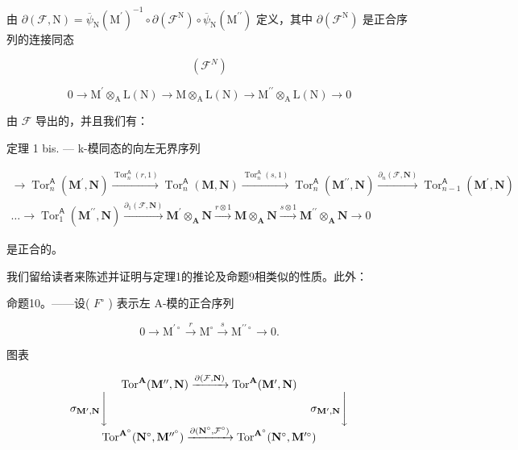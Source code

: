由 \(\partial(\mathcal{F},\mathrm{N})=\overline{\psi}_{\mathrm{N}}(\mathrm{M}^{\prime})^{-1}\circ\partial(\mathcal{F}^{\mathrm{N}})\circ\overline{\psi}_{\mathrm{N}}(\mathrm{M}^{\prime\prime})\) 定义，其中 \(\partial(\mathcal{F}^{\mathrm{N}})\) 是正合序列的连接同态

\[
(\mathcal {F} ^ {N})
\]

\[
0 \rightarrow \mathrm{M} ^ {\prime} \otimes_ {\mathrm{A}} \mathrm{L} (\mathrm{N}) \rightarrow \mathrm{M} \otimes_ {\mathrm{A}} \mathrm{L} (\mathrm{N}) \rightarrow \mathrm{M} ^ {\prime \prime} \otimes_ {\mathrm{A}} \mathrm{L} (\mathrm{N}) \rightarrow 0
\]

由 \(\mathcal{F}\) 导出的，并且我们有：

定理 1 bis. --- k-模同态的向左无界序列

\[
\begin{array}{l}\rightarrow \operatorname{Tor} _ {n} ^ {\mathsf {A}} (\mathbf {M} ^ {\prime}, \mathbf {N}) \xrightarrow {\operatorname{Tor} _ {n} ^ {\mathsf {A}} (r , 1)} \operatorname{Tor} _ {n} ^ {\mathsf {A}} (\mathbf {M}, \mathbf {N}) \xrightarrow {\operatorname{Tor} _ {n} ^ {\mathsf {A}} (s , 1)} \operatorname{Tor} _ {n} ^ {\mathsf {A}} (\mathbf {M} ^ {\prime \prime}, \mathbf {N}) \xrightarrow {\partial_ {n} (\mathcal {F} , \mathbf {N})} \operatorname{Tor} _ {n - 1} ^ {\mathsf {A}} (\mathbf {M} ^ {\prime}, \mathbf {N})\\\dots \rightarrow \operatorname{Tor} _ {1} ^ {\mathsf {A}} (\mathbf {M} ^ {\prime \prime}, \mathbf {N}) \xrightarrow {\partial_ {1} (\mathcal {F} , \mathbf {N})} \mathbf {M} ^ {\prime} \otimes_ {\mathbf {A}} \mathbf {N} \xrightarrow {r \otimes 1} \mathbf {M} \otimes_ {\mathbf {A}} \mathbf {N} \xrightarrow {s \otimes 1} \mathbf {M} ^ {\prime \prime} \otimes_ {\mathbf {A}} \mathbf {N} \longrightarrow 0\end{array}
\]

是正合的。

我们留给读者来陈述并证明与定理1的推论及命题9相类似的性质。此外：

命题10。——设( \(F^{\circ}\) ) 表示左 A-模的正合序列

\[
0 \rightarrow \mathrm{M} ^ {\prime \circ} \xrightarrow {r} \mathrm{M} ^ {\circ} \xrightarrow {s} \mathrm{M} ^ {\prime \prime \circ} \rightarrow 0.
\]

图表

\[
\begin{array}{c} \operatorname{Tor} ^ {\mathbf {A}} (\mathbf {M} ^ {\prime \prime}, \mathbf {N}) \xrightarrow {\partial (\mathcal {F} , \mathbf {N})} \operatorname{Tor} ^ {\mathbf {A}} (\mathbf {M} ^ {\prime}, \mathbf {N}) \\ \sigma_ {\mathbf {M} ^ {\prime}, \mathbf {N}} \Biggl \downarrow \qquad \qquad \qquad \qquad \qquad \qquad \qquad \qquad \qquad \sigma_ {\mathbf {M} ^ {\prime}, \mathbf {N}} \Biggl \downarrow \\ \operatorname{Tor} ^ {\mathbf {A} ^ {\circ}} (\mathbf {N} ^ {\circ}, \mathbf {M} ^ {\prime \prime^ {\circ}}) \xrightarrow {\partial (\mathbf {N} ^ {\circ} , \mathcal {F} ^ {\circ})} \operatorname{Tor} ^ {\mathbf {A} ^ {\circ}} (\mathbf {N} ^ {\circ}, \mathbf {M} ^ {\prime \circ}) \end{array}
\]

